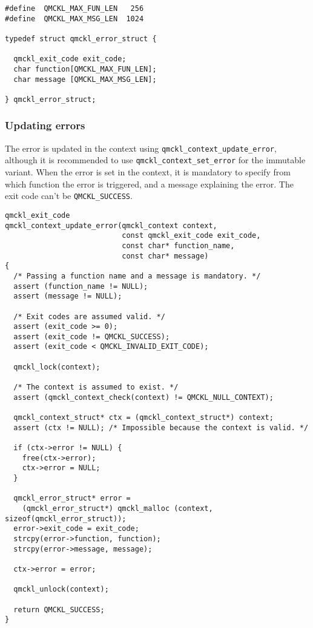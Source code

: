 \begin{verbatim}
#define  QMCKL_MAX_FUN_LEN   256
#define  QMCKL_MAX_MSG_LEN  1024

typedef struct qmckl_error_struct {

  qmckl_exit_code exit_code;
  char function[QMCKL_MAX_FUN_LEN];
  char message [QMCKL_MAX_MSG_LEN];

} qmckl_error_struct;
\end{verbatim}

\subsubsection{Updating errors}
\label{sec:orgb2ce614}

The error is updated in the context using
\texttt{qmckl\_context\_update\_error}, although it is recommended to use
\texttt{qmckl\_context\_set\_error} for the immutable variant.
When the error is set in the context, it is mandatory to specify
from which function the error is triggered, and a message
explaining the error. The exit code can't be \texttt{QMCKL\_SUCCESS}.

\begin{verbatim}
qmckl_exit_code
qmckl_context_update_error(qmckl_context context,
                           const qmckl_exit_code exit_code,
                           const char* function_name,
                           const char* message)
{
  /* Passing a function name and a message is mandatory. */
  assert (function_name != NULL);
  assert (message != NULL);

  /* Exit codes are assumed valid. */
  assert (exit_code >= 0);
  assert (exit_code != QMCKL_SUCCESS);
  assert (exit_code < QMCKL_INVALID_EXIT_CODE);

  qmckl_lock(context);
  
  /* The context is assumed to exist. */
  assert (qmckl_context_check(context) != QMCKL_NULL_CONTEXT);

  qmckl_context_struct* ctx = (qmckl_context_struct*) context;
  assert (ctx != NULL); /* Impossible because the context is valid. */

  if (ctx->error != NULL) {
    free(ctx->error);
    ctx->error = NULL;
  }

  qmckl_error_struct* error =
    (qmckl_error_struct*) qmckl_malloc (context, sizeof(qmckl_error_struct));
  error->exit_code = exit_code;
  strcpy(error->function, function);
  strcpy(error->message, message);

  ctx->error = error;

  qmckl_unlock(context);
  
  return QMCKL_SUCCESS;
}
\end{verbatim}

